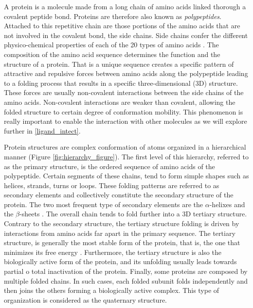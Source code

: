 \documentclass[11pt, b5paper,twoside]{tesi_upf}
\begin{document}
\par A protein is a molecule made from a long chain of amino acids linked thorough a covalent peptide bond. Proteins are therefore also known as \textit{polypeptides}. Attached to this repetitive chain are those portions of the amino acids that are not involved in the covalent bond, the side chains. Side chains confer the different physico-chemical properties of each of the 20 types of amino acids \cite{alberts2008molecular}. The composition of the amino acid sequence determines the function and the structure of a protein. That is a unique sequence creates a specific pattern of attractive and repulsive forces between amino acids along the polypeptide leading to a folding process that results in a specific three-dimensional (3D) structure. These forces are usually non-covalent  interactions between the side chains of the amino acids. Non-covalent interactions are weaker than covalent, allowing the folded structure to certain degree of  conformation mobility. This phenomenon is really important to enable the interaction with other molecules as we will explore further in \cref{ligand_intect}.
\par Protein structures are complex conformation of atoms organized in a hierarchical manner (Figure \ref{fig:hierarchy_figure}). The first level of this hierarchy, referred to as the primary structure, is the ordered sequence of amino acids of the polypeptide. Certain segments of these chains, tend to form simple shapes such as helices, strands, turns or loops.  These folding patterns are referred to as secondary elements and collectively constitute the secondary structure of the protein. The two most frequent type of secondary elements are the $\alpha$-helixes and the $\beta$-sheets \cite{DSSP}. The overall chain tends to fold further into a 3D tertiary structure. Contrary to the secondary structure, the tertiary structure folding is driven by interactions from amino acids far apart in the primary sequence. The tertiary structure, is generally the most stable form of the protein, that is, the one that minimizes its free energy \cite{Dill1990}. Furthermore, the tertiary structure is also the biologically active form of the protein, and its unfolding usually leads towards partial o total inactivation of the protein. Finally, some proteins are composed by multiple folded chains. In such cases, each folded subunit folds independently and then joins the others forming a biologically active complex. This type of organization is considered as the quaternary structure.
\end{document}

